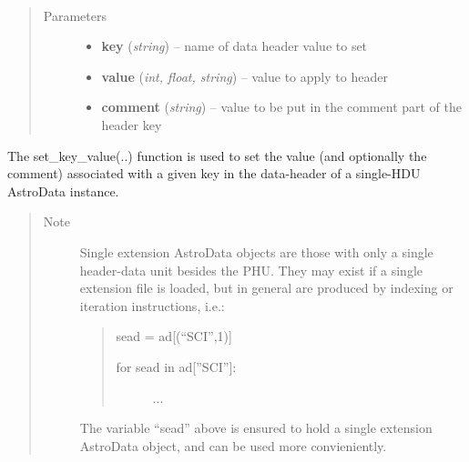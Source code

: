 \documentclass[letterpaper,10pt,english]{sphinxmanual}
\begin{document}

\begin{fulllineitems}
\label{chapter_AstroDataClass:astrodata.data.AstroData.set_key_value}~\begin{quote}\begin{description}
\item[{Parameters}] \leavevmode\begin{itemize}
\item {} 
\textbf{key} (\emph{string}) -- name of data header value to set

\item {} 
\textbf{value} (\emph{int, float, string}) -- value to apply to header

\item {} 
\textbf{comment} (\emph{string}) -- value to be put in the comment part of the header key

\end{itemize}

\end{description}\end{quote}

The set\_key\_value(..) function is used to set the value (and optionally
the comment) associated
with a given key in the data-header of a single-HDU AstroData instance.
\begin{quote}\begin{description}
\item[{Note }] \leavevmode
Single extension AstroData objects are those with only a single
header-data unit besides the PHU.  They may exist if a single
extension file is loaded, but in general are produced by indexing or
iteration instructions, i.e.:
\begin{quote}

sead = ad{[}(``SCI'',1){]}
\begin{description}
\item[{for sead in ad{[}''SCI''{]}:}] \leavevmode
...

\end{description}
\end{quote}

The variable ``sead'' above is ensured to hold a single extension
AstroData object, and can be used more convieniently.

\end{description}\end{quote}

\end{fulllineitems}
\end{document}
